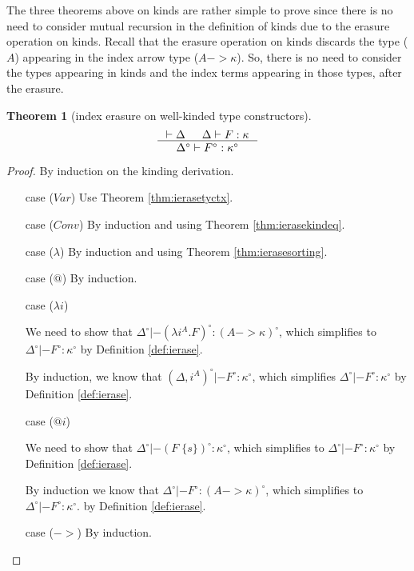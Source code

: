 \documentclass[preprint]{sigplanconf}
\theoremstyle{plain}
\newtheorem{theorem}{Theorem}
\theoremstyle{remark}
\theoremstyle{definition}
\begin{document}
The three theorems above on kinds are rather simple to prove since there is
no need to consider mutual recursion in the definition of kinds due to
the erasure operation on kinds. Recall that the erasure operation on kinds
discards the type ($A$) appearing in the index arrow type ($A -> \kappa$).
So, there is no need to consider the types appearing in kinds
and the index terms appearing in those types, after the erasure.\\

\begin{theorem}[index erasure on well-kinded type constructors]
\label{thm:ierasekinding}
\[ \inference{|- \Delta & \Delta |- F : \kappa}
		{\Delta^\circ |- F^\circ : \kappa^\circ}
\]
\end{theorem}
\begin{proof}
	By induction on the kinding derivation.
\begin{itemize}
\item[case] ($Var$)
	Use Theorem \ref{thm:ierasetyctx}.

\item[case] ($Conv$)
	By induction and using Theorem \ref{thm:ierasekindeq}.

\item[case] ($\lambda$)
	By induction and using Theorem \ref{thm:ierasesorting}.

\item[case] ($@$)
	By induction.

\item[case] ($\lambda i$)

	We need to show that
	$\Delta^\circ |- (\lambda i^A.F)^\circ : (A -> \kappa)^\circ$,
	which simplifies to $\Delta^\circ |- F^\circ : \kappa^\circ$
	by Definition \ref{def:ierase}.

	By induction, we know that
	$(\Delta,i^A)^\circ |- F^\circ : \kappa^\circ $,
	which simplifies $\Delta^\circ |- F^\circ : \kappa^\circ$
	by Definition \ref{def:ierase}.

\item[case] ($@ i$)

	We need to show that
	$\Delta^\circ |- (F\;\{s\})^\circ : \kappa^\circ$,
	which simplifies to $\Delta^\circ |- F^\circ : \kappa^\circ$
	by Definition \ref{def:ierase}.

	By induction we know that
	$\Delta^\circ |- F^\circ : (A -> \kappa)^\circ$,
	which simplifies to $\Delta^\circ |- F^\circ : \kappa^\circ$.
	by Definition \ref{def:ierase}.

\item[case] ($->$)
	By induction.


\end{itemize}
\end{proof}
\end{document}
